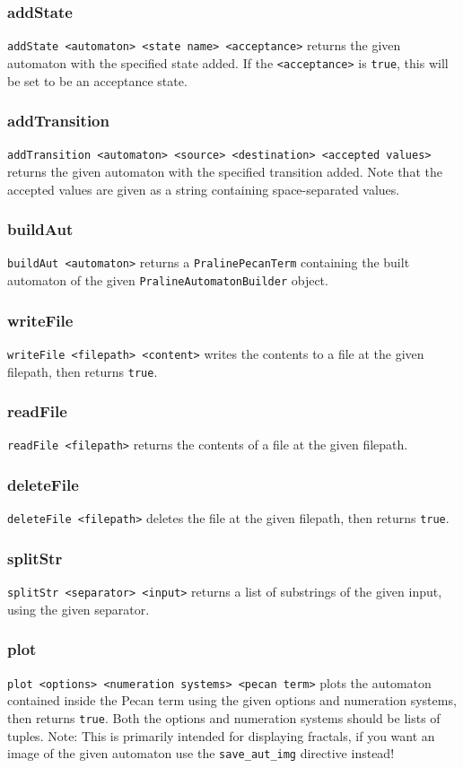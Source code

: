 \documentclass{report}
\begin{document}
\subsubsection{addState}
\verb+addState <automaton> <state name> <acceptance>+ returns the given automaton with the specified state added.
If the \verb+<acceptance>+ is \verb+true+, this will be set to be an acceptance state.

\subsubsection{addTransition}
\verb+addTransition <automaton> <source> <destination> <accepted values>+ returns the given automaton with the specified transition added.
Note that the accepted values are given as a string containing space-separated values.

\subsubsection{buildAut}
\verb+buildAut <automaton>+ returns a \verb+PralinePecanTerm+ containing the built automaton of the given \verb+PralineAutomatonBuilder+ object.

\subsubsection{writeFile}
\verb+writeFile <filepath> <content>+ writes the contents to a file at the given filepath, then returns \verb+true+.

\subsubsection{readFile}
\verb+readFile <filepath>+ returns the contents of a file at the given filepath.

\subsubsection{deleteFile}
\verb+deleteFile <filepath>+ deletes the file at the given filepath, then returns \verb+true+.

\subsubsection{splitStr}
\verb+splitStr <separator> <input>+ returns a list of substrings of the given input, using the given separator.

\subsubsection{plot}
\verb+plot <options> <numeration systems> <pecan term>+ plots the automaton contained inside the Pecan term using the given options and numeration systems, then returns \verb+true+.
Both the options and numeration systems should be lists of tuples.
Note: This is primarily intended for displaying fractals, if you want an image of the given automaton use the \verb+save_aut_img+ directive instead!
\end{document}
